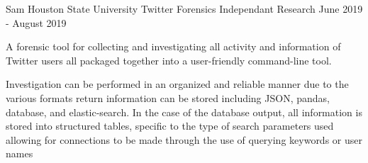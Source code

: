 \begin{cventries}
    \cventry
      {Sam Houston State University} %
      {Twitter Forensics} %
	  {Independant Research} %
      {June 2019 - August 2019} %
      {
        \begin{cvitems} %
          \item {A forensic tool for collecting and investigating all activity and information of Twitter users all packaged together into a user-friendly command-line tool.}
          \item {Investigation can be performed in an organized and reliable manner due to the various formats return information can be stored including JSON, pandas, database, and elastic-search. In the case of the database output, all information is stored into structured tables, specific to the type of search parameters used allowing for connections to be made through the use of querying keywords or user names}
       \end{cvitems}
      }

\end{cventries}
